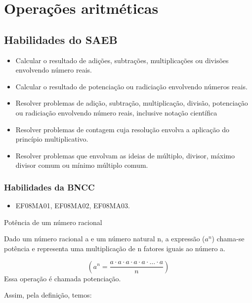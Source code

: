 

\chapter{Operações
aritméticas}

\section{Habilidades do SAEB}

\begin{itemize}
  \item Calcular o resultado de adições, subtrações,
multiplicações ou divisões envolvendo número reais.
\item
  Calcular o resultado de potenciação ou radiciação envolvendo números
  reais.
\item
  Resolver problemas de adição, subtração, multiplicação, divisão,
  potenciação ou radiciação envolvendo número reais, inclusive notação
  científica
\item
  Resolver problemas de contagem cuja resolução envolva a aplicação do
  princípio multiplicativo.
\item
  Resolver problemas que envolvam as ideias de múltiplo, divisor, máximo
  divisor comum ou mínimo múltiplo comum.
\end{itemize}

\subsection{Habilidades da BNCC}

\begin{itemize}
\item EF08MA01, EF08MA02, EF08MA03.
\end{itemize}

Potência de um número racional

Dado um número racional a e um número natural n, a expressão ($a^n$)
chama-se potência e representa uma multiplicação de n fatores iguais ao
número a.

$$(a^n = \frac{a \cdot a \cdot a \cdot a \cdot a \cdot \ldots \cdot a}{n})$$
Essa operação é chamada potenciação.

Assim, pela definição, temos:

